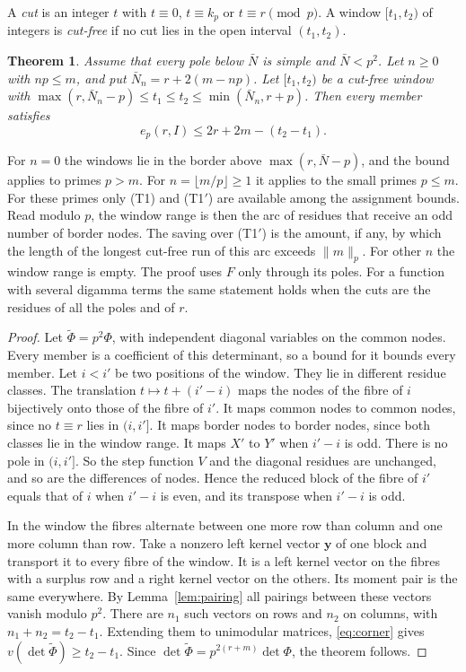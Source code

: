 \documentclass[11pt]{amsart}
\newtheorem{theorem}{Theorem}[section]
\theoremstyle{definition}
\theoremstyle{remark}
\numberwithin{equation}{section}
\begin{document}
A \emph{cut} is an integer $t$ with $t\equiv0$, $t\equiv k_p$ or $t\equiv r\pmod p$. A window $[t_1,t_2)$ of integers is
\emph{cut-free} if no cut lies in the open interval $(t_1,t_2)$.

\begin{theorem}\label{thm:window}
Assume that every pole below $\bar N$ is simple and $\bar N<p^2$. Let $n\ge0$ with $np\le m$, and put $\bar N_n=r+2(m-np)$. Let
$[t_1,t_2)$ be a cut-free window with $\max(r,\bar N_n-p)\le t_1\le t_2\le\min(\bar N_n,r+p)$. Then every member satisfies
\[
 e_p(r,I)\le2r+2m-(t_2-t_1).
\]
\end{theorem}
For $n=0$ the windows lie in the border above $\max(r,\bar N-p)$, and the bound applies to primes $p>m$. For
$n=\lfloor m/p\rfloor\ge1$ it applies to the small primes $p\le m$. For these primes only (T1) and (T1$'$) are
available among the assignment bounds. Read modulo $p$, the window range is then the arc of residues that receive an odd
number of border nodes. The saving over (T1$'$) is the amount, if any, by which the length of the longest cut-free run
of this arc exceeds $\|m\|_p$. For other $n$ the window range is empty. The proof uses $F$ only through its poles.
For a function with several digamma terms the same statement holds when the cuts are the residues of all the poles and
of $r$.

\begin{proof}
Let $\widetilde\Phi=p^2\Phi$, with independent diagonal variables on the common nodes. Every member is a coefficient of
this determinant, so a bound for it bounds every member. Let $i<i'$ be two positions of the window. They lie in
different residue classes. The translation $t\mapsto t+(i'-i)$ maps the nodes of the fibre of $i$ bijectively onto those
of the fibre of $i'$. It maps common nodes to common nodes, since no $t\equiv r$ lies in $(i,i']$. It maps border nodes
to border nodes, since both classes lie in the window range. It maps $X'$ to $Y'$ when $i'-i$ is odd. There is no pole
in $(i,i']$. So the step function $V$ and the diagonal residues are unchanged, and so are the differences of nodes.
Hence the reduced block of the fibre of $i'$ equals that of $i$ when $i'-i$ is even, and its transpose when $i'-i$ is
odd.

In the window the fibres alternate between one more row than column and one more column than row. Take a nonzero left
kernel vector $\mathbf y$ of one block and transport it to every fibre of the window. It is a left kernel vector on the
fibres with a surplus row and a right kernel vector on the others. Its moment pair is the same everywhere. By
Lemma~\ref{lem:pairing} all pairings between these vectors vanish modulo $p^2$. There are $n_1$ such vectors on rows and
$n_2$ on columns, with $n_1+n_2=t_2-t_1$. Extending them to unimodular matrices, \eqref{eq:corner} gives
$v(\det\widetilde\Phi)\ge t_2-t_1$. Since $\det\widetilde\Phi=p^{2(r+m)}\det\Phi$, the theorem follows.
\end{proof}
\end{document}
